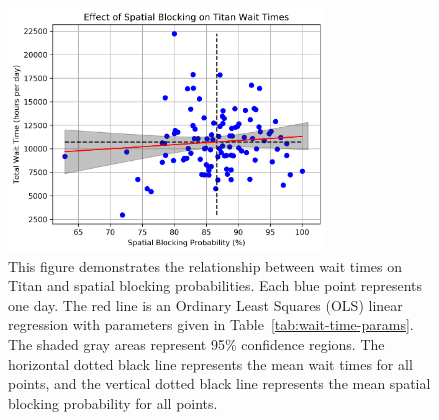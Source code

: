 \begin{figure}
  \includegraphics[width=0.75\textwidth]{images/linfit-wait-time-vs-spatial-blocking-by-day.png}
\caption{This figure demonstrates the relationship between wait times on Titan
and spatial blocking probabilities. Each blue point represents one day. The red
line is an Ordinary Least Squares (OLS) linear regression with parameters given
in Table~\ref{tab:wait-time-params}. The shaded gray areas represent 95\%
confidence regions. The horizontal dotted black line represents the mean wait
times for all points, and the vertical dotted black line represents the mean
spatial blocking probability for all points.}
\label{fig:wait-time-spatial-all}
\end{figure}

